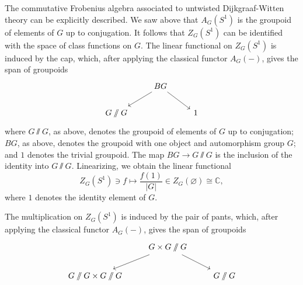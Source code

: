 \documentclass[12pt]{article}
\begin{document}
The commutative Frobenius algebra associated to untwisted Dijkgraaf-Witten theory can be explicitly described. We saw above that $A_G(S^1)$ is the groupoid of elements of $G$ up to conjugation. It follows that $Z_G(S^1)$ can be identified with the space of class functions on $G$. The linear functional on $Z_G(S^1)$ is induced by the cap, which, after applying the classical functor $A_G(-)$, gives the span of groupoids
\[
\begin{tikzcd}
& BG \arrow[dl] \arrow[dr] & \\
G\sslash G & & 1
\end{tikzcd}
\]
where $G\sslash G$, as above, denotes the groupoid of elements of $G$ up to conjugation; $BG$, as above, denotes the groupoid with one object and automorphism group $G$; and $1$ denotes the trivial groupoid. The map $BG \to G\sslash G$ is the inclusion of the identity into $G\sslash G$. Linearizing, we obtain the linear functional
\[
Z_G(S^1) \ni f \longmapsto \frac{f(1)}{|G|} \in Z_G(\varnothing) \cong \mathbb{C},
\]
where $1$ denotes the identity element of $G$.

The multiplication on $Z_G(S^1)$ is induced by the pair of pants, which, after applying the classical functor $A_G(-)$, gives the span of groupoids
\[
\begin{tikzcd}
& G\times G \sslash G \arrow[dl] \arrow[dr] & \\
G\sslash G \times G\sslash G & & G\sslash G
\end{tikzcd}
\]
\end{document}
